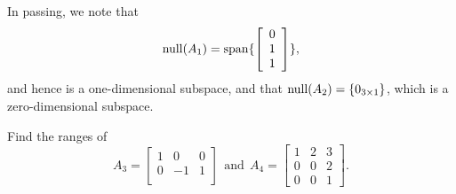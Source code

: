 In passing, we note that $$\mathrm{null}(A_1)=\mathrm{span} \{  \left[\begin{array}{c}  0 \\ 1 \\ 1 \end{array} \right] \}, $$ and hence is a one-dimensional subspace, and that $\mathrm{null}(A_2) = \{0_{3 \times 1} \}$, which is a zero-dimensional subspace.
 \Qed
 
 \vspace*{0.5cm}
 
 \begin{example}
\label{ex:Subspace04B} Find the ranges of 
$$
    A_3=  \left[\begin{array}{rrc}  1 & 0 & 0 \\  0 & -1 & 1 \\ \end{array} \right]~~\text{and}~~
    A_4=\left[\begin{array}{ccc}  1 & 2 & 3 \\  0 & 0 & 2 \\ 0 & 0 & 1\end{array} \right]. $$
 \end{example}

